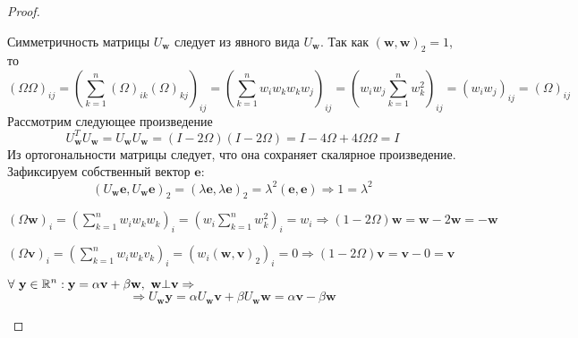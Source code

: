 \begin{proof}

  \begin{enumerate}
    \item Симметричность матрицы $U_\mathbf{w}$ следует из явного вида $U_\mathbf{w}$.
          Так как $(\mathbf{w}, \mathbf{w})_2=1$, то
          \[(\Omega\Omega)_{ij}=\left(\sum_{k=1}^{n}(\Omega)_{ik}(\Omega)_{kj}\right)_{ij}=\left(\sum_{k=1}^{n}w_iw_kw_kw_j\right)_{ij}=\left(w_iw_j\sum_{k=1}^{n}w_k^2\right)_{ij}=\left(w_iw_j\right)_{ij}=(\Omega)_{ij}\]
          Рассмотрим следующее произведение
          \[U_\mathbf{w}^TU_\mathbf{w}=U_\mathbf{w}U_\mathbf{w}=(I-2\Omega)(I-2\Omega)=I-4\Omega+4\Omega\Omega=I\]
          Из ортогональности матрицы следует, что она сохраняет скалярное произведение.
          Зафиксируем собственный вектор $\mathbf{e}$:
          \[(U_{\mathbf{w}}\mathbf{e},U_{\mathbf{w}}\mathbf{e})_2=(\lambda\mathbf{e},\lambda\mathbf{e})_2=\lambda^2(\mathbf{e},\mathbf{e})\Rightarrow1=\lambda^2\]
    \item $\displaystyle (\Omega\mathbf{w})_i=\left(\sum_{k=1}^nw_iw_kw_k\right)_i=\left(w_i\sum_{k=1}^nw_k^2\right)_i=w_i\Rightarrow (1-2\Omega)\mathbf{w}=\mathbf{w}-2\mathbf{w}=-\mathbf{w}$
    \item $\displaystyle (\Omega\mathbf{v})_i=\left(\sum_{k=1}^nw_iw_kv_k\right)_i=\left(w_i(\mathbf{w},\mathbf{v})_2\right)_i=0\Rightarrow (1-2\Omega)\mathbf{v}=\mathbf{v}-0=\mathbf{v}$

          \begin{minipage}{0.4\linewidth}
            \item $\displaystyle \forall\ \mathbf{y}\in\R^n: \mathbf{y}=\alpha \mathbf{v}+\beta \mathbf{w},\ \mathbf{w}\bot\mathbf{v}\Rightarrow$
            \[\Rightarrow U_\mathbf{w}\mathbf{y}=\alpha U_\mathbf{w}\mathbf{v}+\beta U_\mathbf{w}\mathbf{w}=\alpha \mathbf{v}-\beta \mathbf{w}\]
          \end{minipage}\hfill
          \begin{minipage}{0.6\linewidth}
            \centering
          \end{minipage}
  \end{enumerate}
\end{proof}

